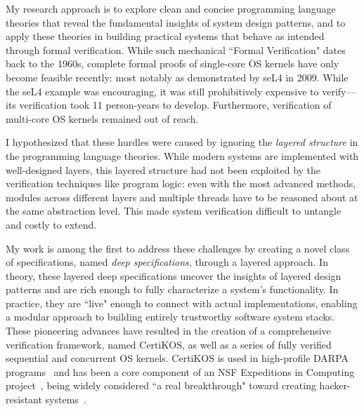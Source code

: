 \documentclass[a4paper, 10pt]{article}
\begin{document}
\begin{small}
My research approach  is to explore clean and concise
programming language theories that 
reveal the fundamental insights of system design patterns,
and to apply these theories
in building practical systems that behave as intended
through formal verification. 
While such mechanical ``Formal Verification" dates back to the 1960s, 
complete formal proofs of single-core OS kernels have only become feasible recently:
most notably as demonstrated by seL4 in 2009. 
While the seL4 example was encouraging, it was still prohibitively expensive to verify---its verification took 11 person-years to develop.
Furthermore, 
verification of multi-core OS kernels 
remained out of reach.
%

I hypothesized that these hurdles were caused by  
ignoring the \emph{layered structure} in the programming language theories.
While modern systems are implemented with
well-designed layers, this layered structure had not been exploited by the verification techniques like program logic:  even with the most advanced methods, modules across different layers and multiple threads have to be reasoned about at 
the same abstraction level. This made system verification
difficult to untangle
and costly to extend.

My work is among the first to address these challenges
by creating a novel class of specifications, named \emph{deep specifications}, through a layered approach.
In theory, these layered deep specifications uncover the 
insights of  layered design patterns
and are rich
enough to fully characterize a system's functionality. In practice, they are ``live" enough to  connect   with  actual  implementations, enabling a modular approach to building
entirely trustworthy
 software system stacks.
These pioneering advances have resulted in the creation of 
 a comprehensive
verification framework, named CertiKOS, as well as
a series of fully verified sequential and concurrent OS kernels.
CertiKOS  is used in high-profile DARPA programs~\cite{crash,hacms}
and has been a core component of an NSF Expeditions in Computing project~\cite{deepspec}, being widely considered
 ``a real breakthrough" toward creating hacker-resistant systems~\cite{news, times, dnews}.



\end{small}
\end{document}
